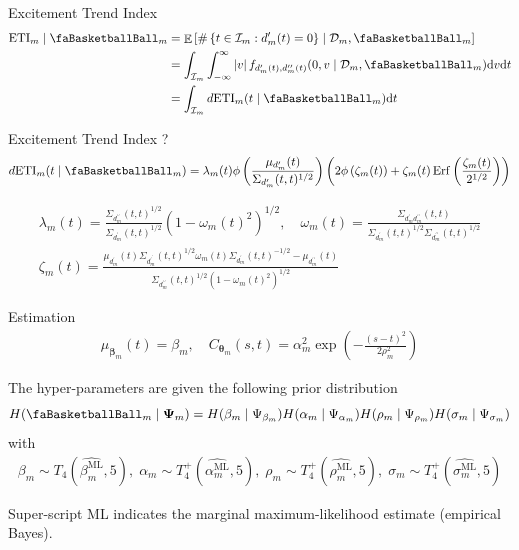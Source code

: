 \documentclass[ignorenonframetext,xcolor=pdflatex,table,dvipsnames,serif]{beamer}
\newcommand{\BTheta}{\text{\faBasketballBall}}
\DeclareMathOperator{\E}{\mathbb{E}}
\DeclareMathOperator{\Erf}{Erf}
\begin{document}
\begin{frame}{Excitement Trend Index}
\begin{align*}
\begin{split}
  \text{ETI}_m \mid \BTheta_m &= \E\left[\#\left\{t \in \mathcal{I}_m : d^\prime_m(t) = 0\right\} \mid \mathcal{D}_m, \BTheta_m\right]\\
  &= \int_{\mathcal{I}_m} \int_{-\infty}^\infty \left|v\right| f_{d^\prime_m(t), d^{\prime\prime}_m(t)}(0, v \mid \mathcal{D}_m, \BTheta_m)\textrm{d}v\textrm{d}t \\
  &= \int_{\mathcal{I}_m} d\mathrm{ETI}_m(t \mid \BTheta_m)\mathrm{d}t
\end{split}
\end{align*}	
\end{frame}


\begin{frame}{Excitement Trend Index}
?
{
\small
\begin{align*}
d\mathrm{ETI}_m(t \mid \BTheta_m) = \lambda_m(t)\phi\left(\frac{\mu_{d_m^\prime}(t)}{\Sigma_{d_m^\prime}(t,t)^{1/2}}\right)\left(2\phi\left(\zeta_m(t)\right) + \zeta_m(t)\Erf\left(\frac{\zeta_m(t)}{2^{1/2}}\right)\right)
\end{align*}
}

{
\small
\begin{gather*}
  \lambda_m(t) = \frac{\Sigma_{d_m^{\prime\prime}}(t,t)^{1/2}}{\Sigma_{d_m^\prime}(t,t)^{1/2}}\left(1-\omega_m(t)^2\right)^{1/2}, \quad \omega_m(t) = \frac{\Sigma_{d_m^\prime d_m^{\prime\prime}}(t,t)}{\Sigma_{d_m^\prime}(t,t)^{1/2}\Sigma_{d_m^{\prime\prime}}(t,t)^{1/2}}\\
  \zeta_m(t) = \frac{\mu_{d_m^\prime}(t)\Sigma_{d_m^{\prime^\prime}}(t,t)^{1/2}\omega_m(t)\Sigma_{d_m^\prime}(t,t)^{-1/2} - \mu_{d_m^{\prime\prime}}(t)}{\Sigma_{d_m^{\prime\prime}}(t,t)^{1/2}\left(1 - \omega_m(t)^2\right)^{1/2}}
\end{gather*}
}
\end{frame}

\begin{frame}{Estimation}
\begin{align*}
  \mu_{\bm{\beta}_m}(t) = \beta_m, \quad C_{\bm{\theta}_m}(s, t) = \alpha^2_m\exp\left(-\frac{(s-t)^2}{2\rho^2_m}\right)
\end{align*}

The hyper-parameters are given the following prior distribution
\begin{align*}
H(\BTheta_m \mid \bm{\Psi}_m) = H(\beta_m \mid \Psi_{\beta_m})H(\alpha_m \mid \Psi_{\alpha_m})H(\rho_m \mid \Psi_{\rho_m})H(\sigma_m \mid \Psi_{\sigma_m})
\end{align*}
with
{
\footnotesize
\begin{align*}
\beta_{m} \sim T_4\left(\widehat{\beta_m^\text{ML}}, 5\right), \; \alpha_m \sim T^+_4\left(\widehat{\alpha_m^\text{ML}}, 5\right), \; \rho_m \sim T_4^+\left(\widehat{\rho_m^\text{ML}}, 5\right), \; \sigma_m \sim T^+_4\left(\widehat{\sigma_m^\text{ML}}, 5\right)
\end{align*}
} 

Super-script ML indicates the marginal maximum-likelihood estimate (empirical Bayes).
\end{frame}
\end{document}
